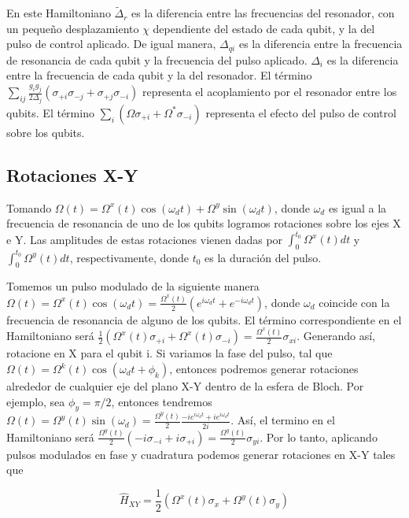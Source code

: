 En este Hamiltoniano $\tilde{\Delta}_r$ es la diferencia entre las frecuencias del resonador, con un pequeño desplazamiento $\chi$ dependiente del estado de cada qubit, y la del pulso de control aplicado. De igual manera, $\Delta_{qi}$ es la diferencia entre la frecuencia de resonancia de cada qubit y la frecuencia del pulso aplicado. $\Delta_i$ es la diferencia entre la frecuencia de cada qubit y la del resonador. El término $\sum\limits_{ij} \frac{g_i g_j}{2 \Delta_j} \left(\sigma_{+i} \sigma_{-j} + \sigma_{+j} \sigma_{-i}\right)$ representa el acoplamiento por el resonador entre los qubits. El término $\sum\limits_i (\Omega \sigma_{+i} + \Omega^* \sigma_{-i})$ representa el efecto del pulso de control sobre los qubits.

\subsection{Rotaciones X-Y}

Tomando $\Omega(t) = \Omega^x(t) \cos(\omega_d t) + \Omega^y \sin(\omega_d t)$, donde $\omega_d$ es igual a la frecuencia de resonancia de uno de los qubits logramos rotaciones sobre los ejes X e Y. Las amplitudes de estas rotaciones vienen dadas por $\int_0^{t_0} \Omega^x(t) dt$ y $\int_0^{t_0} \Omega^y(t) dt$, respectivamente, donde $t_0$ es la duración del pulso.

Tomemos un pulso modulado de la siguiente manera $\Omega(t) = \Omega^x(t) \cos(\omega_d t) = \frac{\Omega^x(t)}{2} (e^{i \omega_d t} + e^{-i \omega_d t})$, donde $\omega_d$ coincide con la frecuencia de resonancia de alguno de los qubits. El término correspondiente en el Hamiltoniano será $\frac{1}{2} (\Omega^x(t) \sigma_{+i} + \Omega^x(t) \sigma_{-i}) = \frac{\Omega^x(t)}{2} \sigma_{xi}$. Generando así, rotacione en X para el qubit i. Si variamos la fase del pulso, tal que $\Omega(t) = \Omega^k(t) \cos(\omega_d t + \phi_k)$, entonces podremos generar rotaciones alrededor de cualquier eje del plano X-Y dentro de la esfera de Bloch. Por ejemplo, sea $\phi_y = \pi/2$, entonces tendremos $\Omega(t) = \Omega^y(t) \sin(\omega_d) = \frac{\Omega^y(t)}{2} \frac{-i e^{i \omega_d t} + i e^{i \omega_d t}}{2i}$. Así, el termino en el Hamiltoniano será $\frac{\Omega^y(t)}{2} (-i \sigma_{-i} + i \sigma_{+i}) = \frac{\Omega^y(t)}{2} \sigma_{yi}$. Por lo tanto, aplicando pulsos modulados en fase y cuadratura podemos generar rotaciones en X-Y tales que

\begin{equation}
    \hat{H}_{XY} = \frac{1}{2} (\Omega^x(t) \sigma_x + \Omega^y(t) \sigma_y)
\end{equation}

